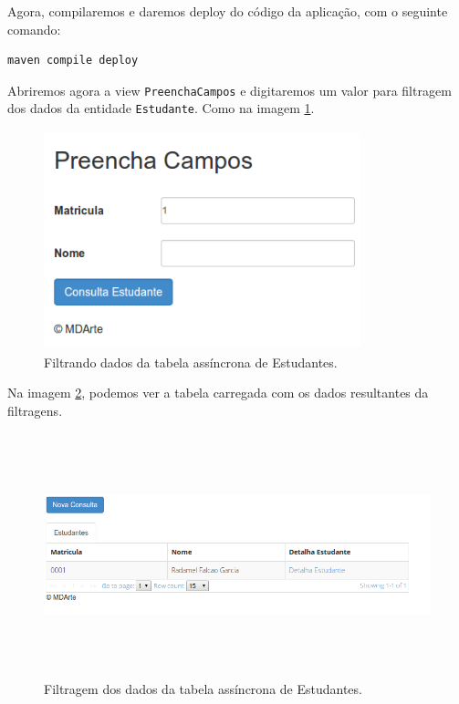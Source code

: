 Agora, compilaremos e daremos deploy do código da aplicação, com o seguinte
comando:

\begin{lstlisting}[language=bash, frame=single, breaklines=true]
maven compile deploy
\end{lstlisting}

Abriremos agora a view \texttt{PreenchaCampos} e digitaremos um valor para
filtragem dos dados da entidade \texttt{Estudante}. Como na imagem
\ref{preencha_campos_tabela_async_simples}.

\begin{figure}[H]
	\centering
	\includegraphics[width=260pt,height=180pt]{files/imgs/tutorial-mdarte-0031.png}
	\caption{Filtrando dados da tabela assíncrona de Estudantes.}
	\label{preencha_campos_tabela_async_simples}
\end{figure}

Na imagem \ref{resultado_consulta_tabela_async_simples}, podemos ver a tabela
carregada com os dados resultantes da filtragens.

\begin{figure}[H]
	\centering
	\includegraphics[width=460pt,height=200pt]{files/imgs/tutorial-mdarte-0032.png}
	\caption{Filtragem dos dados da tabela assíncrona de Estudantes.}
	\label{resultado_consulta_tabela_async_simples}
\end{figure}

